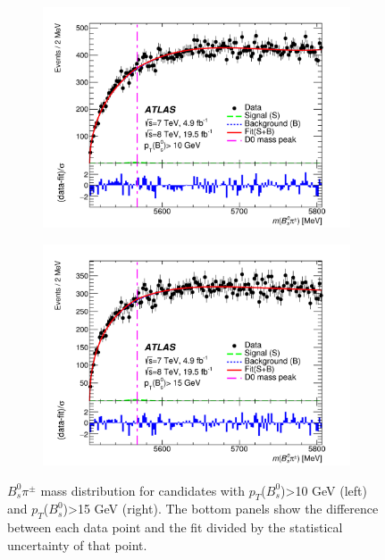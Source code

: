 \documentclass[epj]{webofc}
\begin{document}
\begin{figure}
    \centering
    \begin{subfigure}[h]{0.45\textwidth}
        \includegraphics[width=\textwidth]{plots/5568/fig_02a.png}
    \end{subfigure}
    \begin{subfigure}[h]{0.45\textwidth}
        \includegraphics[width=\textwidth]{plots/5568/fig_02b.png}
    \end{subfigure}
    \caption{$B_{s}^{0}\pi^{\pm}$ mass distribution for candidates with $p_T$($B_{s}^{0}$)>10 GeV (left) and $p_T$($B_{s}^{0}$)>15 GeV (right). 
     The bottom panels show the difference between each data point and the fit divided by the statistical uncertainty of that point.}
    \label{fig:5568}
\end{figure}
\end{document}
